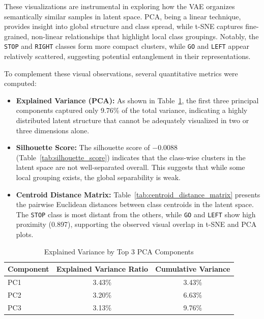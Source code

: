 These visualizations are instrumental in exploring how the VAE organizes semantically similar samples in latent space. PCA, being a linear technique, provides insight into global structure and class spread, while t-SNE captures fine-grained, non-linear relationships that highlight local class groupings. Notably, the \texttt{STOP} and \texttt{RIGHT} classes form more compact clusters, while \texttt{GO} and \texttt{LEFT} appear relatively scattered, suggesting potential entanglement in their representations.

To complement these visual observations, several quantitative metrics were computed:

\begin{itemize}
    \item \textbf{Explained Variance (PCA):} As shown in Table~\ref{tab:pca_explained_variance}, the first three principal components captured only 9.76\% of the total variance, indicating a highly distributed latent structure that cannot be adequately visualized in two or three dimensions alone.
    
    \item \textbf{Silhouette Score:} The silhouette score of $-0.0088$ (Table~\ref{tab:silhouette_score}) indicates that the class-wise clusters in the latent space are not well-separated overall. This suggests that while some local grouping exists, the global separability is weak.

    \item \textbf{Centroid Distance Matrix:} Table~\ref{tab:centroid_distance_matrix} presents the pairwise Euclidean distances between class centroids in the latent space. The \texttt{STOP} class is most distant from the others, while \texttt{GO} and \texttt{LEFT} show high proximity (0.897), supporting the observed visual overlap in t-SNE and PCA plots.
\end{itemize}

\begin{table}[h]
\centering
\caption{Explained Variance by Top 3 PCA Components}
\begin{tabular}{lcc}
\toprule
\textbf{Component} & \textbf{Explained Variance Ratio} & \textbf{Cumulative Variance} \\
\midrule
PC1 & 3.43\% & 3.43\% \\
PC2 & 3.20\% & 6.63\% \\
PC3 & 3.13\% & 9.76\% \\
\bottomrule
\end{tabular}
\label{tab:pca_explained_variance}
\end{table}

